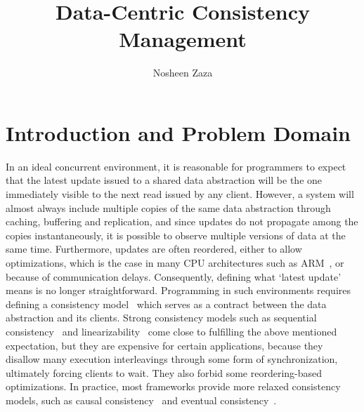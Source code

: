 \documentclass[]{usiinfprospectus}
\author{Nosheen Zaza}
\title{Data-Centric Consistency Management}
\begin{document}
\maketitle


\section{Introduction and Problem Domain}




In an ideal concurrent environment, it is reasonable for programmers to expect that the latest update issued to a shared data abstraction will be the one immediately visible to the next read issued by any client. However, a system will almost always include multiple copies of the same data abstraction through caching, buffering and replication, and since updates do not propagate among the copies instantaneously, it is possible to observe multiple versions of data at the same time. Furthermore, updates are often reordered, either to allow optimizations, which is the case in many CPU architectures such as ARM~\cite{Chong:2008:RAW:1353522.1353528}, or because of communication delays. Consequently, defining what `latest update' means is no longer straightforward. Programming in such environments requires defining a consistency model~\cite{adve1996shared} which serves as a contract between the data abstraction and its clients. Strong consistency models such as sequential consistency~\cite{lamport1979make} and linearizability~\cite{herlihy1990linearizability} come close to fulfilling the above mentioned expectation, but they are expensive for certain applications, because they disallow many execution interleavings through some form of synchronization, ultimately forcing clients to wait. They also forbid some reordering-based optimizations. In practice, most frameworks provide more relaxed consistency models, such as causal consistency~\cite{raynal1995causal} and eventual consistency~\cite{Terry:1995:MUC:224056.224070}. 
\end{document}
